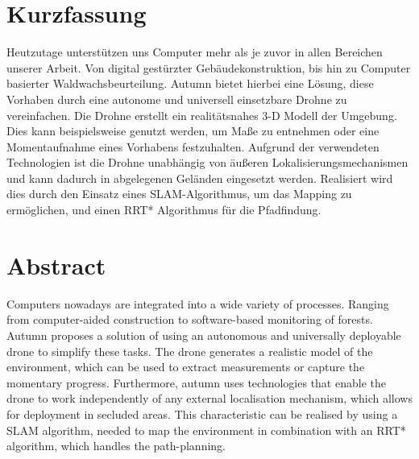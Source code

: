 \chapter{Kurzfassung}

\vspace{10mm}

Heutzutage unterstützen uns Computer mehr als je zuvor in allen Bereichen unserer Arbeit. Von digital gestürzter Gebäudekonstruktion, bis hin zu Computer basierter Waldwachsbeurteilung. Autumn bietet hierbei eine Lösung, diese Vorhaben durch eine autonome und universell einsetzbare Drohne zu vereinfachen. Die Drohne erstellt ein realitätsnahes 3-D Modell der Umgebung. Dies kann beispielsweise genutzt werden, um Maße zu entnehmen oder eine Momentaufnahme eines Vorhabens festzuhalten. Aufgrund der verwendeten Technologien ist die Drohne unabhängig von äußeren Lokalisierungsmechanismen und kann dadurch in abgelegenen Geländen eingesetzt werden. Realisiert wird dies durch den Einsatz eines SLAM-Algorithmus, um das Mapping zu ermöglichen, und einen RRT* Algorithmus für die Pfadfindung.

\chapter{Abstract}

\vspace{10mm}

Computers nowadays are integrated into a wide variety of processes. Ranging from computer-aided construction to software-based monitoring of forests. Autumn proposes a solution of using an autonomous and universally deployable drone to simplify these tasks. The drone generates a realistic model of the environment, which can be used to extract measurements or capture the momentary progress. Furthermore, autumn uses technologies that enable the drone to work independently of any external localisation mechanism, which allows for deployment in secluded areas. This characteristic can be realised by using a SLAM algorithm, needed to map the environment in combination with an RRT* algorithm, which handles the path-planning.
